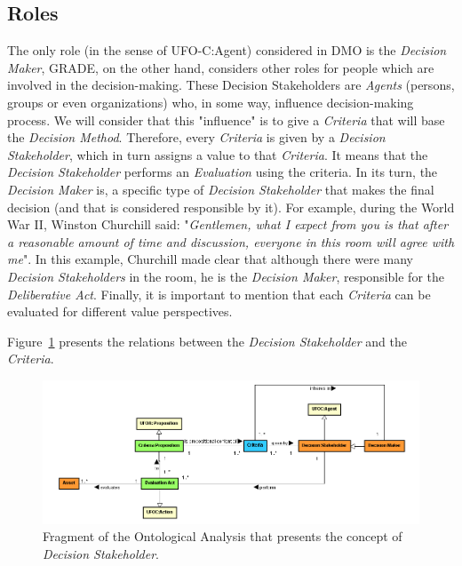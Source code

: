 \subsection{Roles}

The only role (in the sense of UFO-C:Agent) considered in DMO is the \textit{Decision Maker}, GRADE, on the other hand, considers other roles for people which are involved in the decision-making. These Decision Stakeholders are \textit{Agents} (persons, groups or even organizations) who, in some way, influence decision-making process. We will consider that this "influence" is to give a \textit{Criteria} that will base the \textit{Decision Method}. Therefore, every \textit{Criteria} is given by a \textit{Decision Stakeholder}, which in turn assigns a value to that \textit{Criteria}. It means that the \textit{Decision Stakeholder} performs an \textit{Evaluation} using the criteria. In its turn, the \textit{Decision Maker} is, a specific type of \textit{Decision Stakeholder} that makes the final decision (and that is considered responsible by it). For example, during the World War II, Winston Churchill said: "\textit{Gentlemen, what I expect from you is that after a reasonable amount of time and discussion, everyone in this room will agree with me}". In this example, Churchill made clear that although there were many \textit{Decision Stakeholders} in the room, he is the \textit{Decision Maker}, responsible for the \textit{Deliberative Act}. Finally, it is important to mention that each \textit{Criteria} can be evaluated for different value perspectives.

Figure~\ref{fig-ontology-decision-stakeholder} presents the relations between the \textit{Decision Stakeholder} and the \textit{Criteria}.

\begin{figure}
	\centering
	\includegraphics[width=\textwidth]{figuras/fig-ontology-decision-stakeholder} 
	\caption{Fragment of the Ontological Analysis that presents the concept of \textit{Decision Stakeholder}.}
	\label{fig-ontology-decision-stakeholder}
\end{figure}


